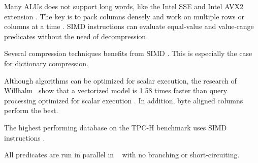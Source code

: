 Many ALUs does not support long words, like the Intel SSE and Intel AVX2 extension \cite{Willhalm2009-hu, Willhalm2013-rl}. The key is to pack columns densely and work on multiple rows or columns at a time \cite{Johnson2008-cp}. SIMD instructions can evaluate equal-value and value-range predicates without the need of decompression.

Several compression techniques benefits from SIMD \cite{Lemke2010-is}. This is especially the case for dictionary compression.

Although algorithms can be optimized for scalar execution, the research of Willhalm \ea~show that a vectorized model is 1.58 times faster than query processing optimized for scalar execution \cite{Willhalm2009-hu}. In addition, byte aligned columns perform the best.

The highest performing database on the TPC-H benchmark uses SIMD instructions \cite{Exasol2014-xh}.

All predicates are run in parallel in \blink~\cite{Raman2008-gi} with no branching or short-circuiting.

